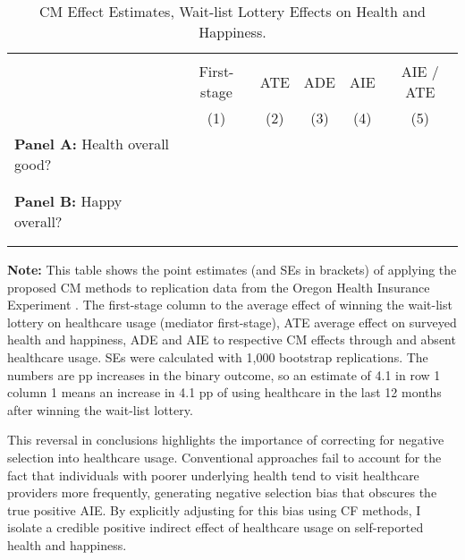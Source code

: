 \begin{table}[!h]
    \singlespacing
    \centering
    \small
    \caption{CM Effect Estimates, Wait-list Lottery Effects on Health and Happiness.}
    \begin{tabular}{l c c c c c}
        \\[-1.8ex]\hline \hline \\[-1.8ex] 
        & First-stage & ATE & ADE & AIE & AIE / ATE \\
        \cmidrule(lr){2-6}
        & (1) & (2) & (3) & (4) & (5) \\
        \midrule
        \multicolumn{1}{l}{\textbf{Panel A:} Health overall good?} \\
        
        \\[-1.8ex]\hline \\[-1.8ex]
        \multicolumn{1}{l}{\textbf{Panel B:} Happy overall?} \\
        
        \\[-1.8ex]\hline \\[-1.8ex]
    \end{tabular}
    \vspace{-0.125cm}
    \label{tab:cm-oregon}
    \justify
    \footnotesize
    \textbf{Note:}
    This table shows the point estimates (and SEs in brackets) of applying the proposed CM methods to replication data from the Oregon Health Insurance Experiment \citep{icspr2014oregon}.
    The first-stage column to the average effect of winning the wait-list lottery on healthcare usage (mediator first-stage), ATE average effect on surveyed health and happiness, ADE and AIE to respective CM effects through and absent healthcare usage.
    SEs were calculated with 1,000 bootstrap replications.
    The numbers are pp increases in the binary outcome, so an estimate of 4.1 in row 1 column 1 means an increase in 4.1 pp of using healthcare in the last 12 months after winning the wait-list lottery.
\end{table}

This reversal in conclusions highlights the importance of correcting for negative selection into healthcare usage.
Conventional approaches fail to account for the fact that individuals with poorer underlying health tend to visit healthcare providers more frequently, generating negative selection bias that obscures the true positive AIE.
By explicitly adjusting for this bias using CF methods, I isolate a credible positive indirect effect of healthcare usage on self-reported health and happiness.

